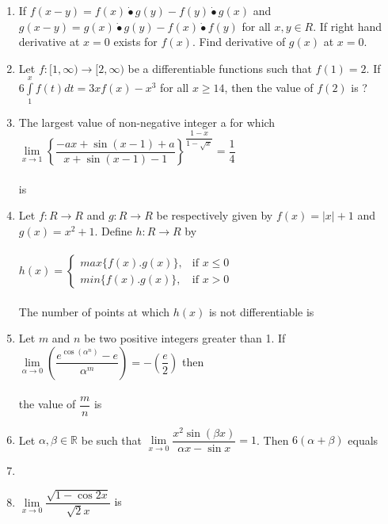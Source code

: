 \begin{enumerate}[label=\arabic*.,ref=\thesubsection.\theenumi]
\item If $f(x-y)=f(x)\dot{•}g(y)-f(y)\dot{•}g(x)$ and $g(x-y)=g(x)\dot{•}g(y)-f(x)\dot{•}f(y)$ for all $x, y \in R$. If right hand derivative at $x=0$ exists for $f(x)$. Find derivative of $g(x)$ at $x=0$.\\

\item Let $f:[1,\infty) \to [2,\infty)$ be a differentiable functions such that $f(1)=2$. If $6\int\limits_1^xf(t)dt=3xf(x)-x^3$ for all $x \geq 14$, then the value of $f(2)$ is ?\\

\item The largest value of non-negative integer a for which \\
$\lim\limits_{x \to 1}\left\{\dfrac{-ax+\sin(x-1)+a}{x+\sin(x-1)-1}\right\}^{\dfrac{1-x}{1-\sqrt{x}}}=\dfrac{1}{4}$ \\ \\is
\\

\item Let $f: R \to R$ and $g: R \to R$ be respectively given by $f(x)=|x|+1$ and $g(x)=x^2+1$. Define $h: R \to R$ by \\ \\
$h(x)=\begin{cases}
max \{f(x).g(x)\}, &\text{if $x\leq 0$}\\
min \{f(x).g(x)\}, &\text{if $x>0$}
\end{cases}$\\ \\
The number of points at which $h(x)$ is not differentiable is\\

\item Let $m$ and $n$ be two positive integers greater than 1. If $\lim\limits_{\alpha \to 0}\left(\dfrac{e^{\cos(\alpha^n)}-e}{\alpha^m}\right)=-\left(\dfrac{e}{2}\right)$ then \\
\\the value of $\dfrac{m}{n}$ is

\item Let $\alpha, \beta \in \mathbb{R}$ be such that $\lim\limits_{x \to 0}\dfrac{x^2\sin(\beta x)}{\alpha x-\sin x}=1$. Then $6(\alpha+\beta)$ equals \item[~]

\item $\lim\limits_{x \to 0}\dfrac{\sqrt{1-\cos 2x}}{\sqrt{2}x}$ is
\begin{itemize}
\end{itemize}


\end{enumerate}
